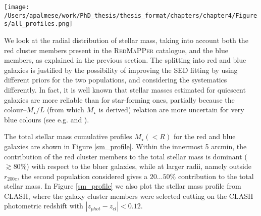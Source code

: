 {\begin{figure*}
\texttt{[image: /Users/apalmese/work/PhD\_thesis/thesis\_format/chapters/chapter4/Figures/all\_profiles.png]}
\caption{Cumulative radial distributions of total stellar mass for the DES red (red points), blue (blue points) and all galaxies (purple points) in the cluster, together with the total, non-parametric mass profile reconstructed from DES weak lensing (\citealt{melchior}, green points). The purple solid line is our NFW fit to the DES stellar mass profile, while the blue solid line is the NFW best fit from DES weak lensing. The black points represent the CLASH total stellar mass profile computed in this work, with our NFW fit (black solid line). The red solid line is the \citet{umetsu15} NFW best-fit for CLASH from a strong lensing, weak lensing and magnification joint analysis. This profile is restricted to the NFW fitting range $R<2 {\rm Mpc }\; h^{-1}$ chosen in \citet{umetsu15}, which is larger than the HST field of view as other datasets were used in a joint analysis. The radius $R$ is projected, and $r_{200c}=2.2$ Mpc. Errorbars show the 68\% confidence level. }\label{sm_profile}
\end{figure*}

We look at the radial distribution of stellar mass, taking into account both the red cluster members present in the \textsc{RedMaPPer} catalogue, and the blue members, as explained in the previous section. The splitting into red and blue galaxies is justified by the possibility of improving the SED fitting by using different priors for the two populations, and considering the systematics differently. In fact, it is well known that stellar masses estimated for quiescent galaxies are more reliable than for star-forming ones, partially because the colour--$M_\star/L$ (from which $M_\star$ is derived) relation are more uncertain for very blue colours (see e.g. \citealt{conroy} and \citealt{banerji}).

The total stellar mass cumulative profiles $M_\star(<R)$ for the red and blue galaxies are shown in Figure \ref{sm_profile}. Within the innermost 5 arcmin, the contribution of the red cluster members to the total stellar mass is dominant ($\gtrsim 80\%$) with respect to the bluer galaxies, while at larger radii, namely outside $r_{200c}$, the second population considered gives a $20\ldots 50\%$ contribution to the total stellar mass.
In Figure \ref{sm_profile} we also plot the stellar mass profile from CLASH, where the galaxy cluster members were selected cutting on the CLASH photometric redshift with $|z_{phot}-z_{cl}|<0.12$.
 
}
